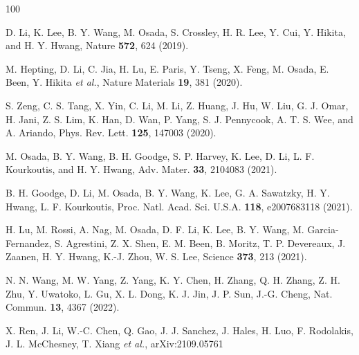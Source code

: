\documentclass[prl,twocolumn,preprintnumbers,superscriptaddress]{revtex4-1}
\begin{document}
\begin{thebibliography}{100}



D. Li, K. Lee, B. Y. Wang, M. Osada, S. Crossley, H. R. Lee, Y. Cui, Y. Hikita, and H. Y. Hwang, Nature \textbf{572}, 624 (2019). 

M. Hepting, D. Li, C. Jia, H. Lu, E. Paris, Y. Tseng, X. Feng, M. Osada, E. Been, Y. Hikita \emph{et al.}, Nature Materials \textbf{19}, 381 (2020).

S. Zeng, C. S. Tang, X. Yin, C. Li, M. Li, Z. Huang, J. Hu, W. Liu, G. J. Omar, H. Jani, Z. S. Lim, K. Han, D. Wan, P. Yang, S. J. Pennycook, A. T. S. Wee, and A. Ariando, Phys. Rev. Lett. \textbf{125}, 147003 (2020).

M. Osada, B. Y. Wang, B. H. Goodge, S. P. Harvey, K. Lee, D. Li, L. F. Kourkoutis, and H. Y. Hwang, Adv. Mater. \textbf{33}, 2104083 (2021).

B. H. Goodge, D. Li, M. Osada, B. Y. Wang, K. Lee, G. A. Sawatzky, H. Y. Hwang, L. F. Kourkoutis, Proc. Natl. Acad. Sci. U.S.A. \textbf{118}, e2007683118 (2021).

H. Lu, M. Rossi, A. Nag, M. Osada, D. F. Li, K. Lee, B. Y. Wang, M. Garcia-Fernandez, S. Agrestini, Z. X. Shen, E. M. Been, B. Moritz, T. P. Devereaux, J. Zaanen, H. Y. Hwang, K.-J. Zhou, W. S. Lee, Science \textbf{373}, 213 (2021).

N. N. Wang, M. W. Yang, Z. Yang, K. Y. Chen, H. Zhang, Q. H. Zhang, Z. H. Zhu, Y. Uwatoko, L. Gu, X. L. Dong, K. J. Jin, J. P. Sun, J.-G. Cheng, Nat. Commun. \textbf{13}, 4367 (2022).

X. Ren, J. Li, W.-C. Chen, Q. Gao, J. J. Sanchez, J. Hales, H. Luo, F. Rodolakis, J. L. McChesney, T. Xiang \emph{et al.}, 
arXiv:2109.05761



\end{thebibliography}
\end{document}
